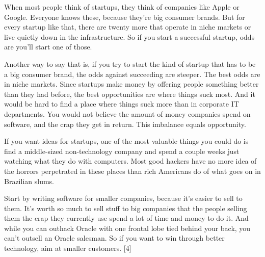 When
                    most people think of startups, they think of companies like
                    Apple or Google. Everyone knows these, because they're big
                    consumer brands. But for every startup like that, there are
                    twenty more that operate in niche markets or live quietly
                    down in the infrastructure. So if you start a successful
                    startup, odds are you'll start one of those.

Another
                    way to say that is, if you try to start the kind of startup
                    that has to be a big consumer brand, the odds against
                    succeeding are steeper. The best odds are in niche markets.
                    Since startups make money by offering people something
                    better than they had before, the best opportunities are
                    where things suck most. And it would be hard to find a place
                    where things suck more than in corporate IT departments. You
                    would not believe the amount of money companies spend on
                    software, and the crap they get in return. This imbalance
                    equals opportunity.

If you want ideas for
                    startups, one of the most valuable things you could do is
                    find a middle-sized non-technology company and spend a
                    couple weeks just watching what they do with computers. Most
                    good hackers have no more idea of the horrors perpetrated in
                    these places than rich Americans do of what goes on in
                    Brazilian slums.

Start by writing software for
                    smaller companies, because it's easier to sell to them. It's
                    worth so much to sell stuff to big companies that the people
                    selling them the crap they currently use spend a lot of time
                    and money to do it. And while you can outhack Oracle with
                    one frontal lobe tied behind your back, you can't outsell an
                    Oracle salesman. So if you want to win through better
                    technology, aim at smaller customers. [4]

